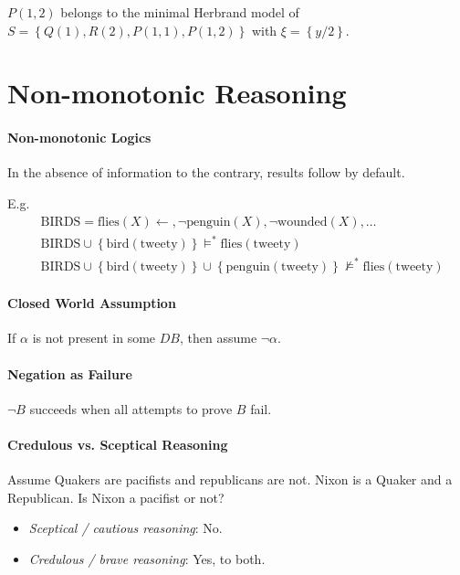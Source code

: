 \documentclass[twocolumn,english]{article}
\begin{document}
$P\left(1,2\right)$ belongs to the minimal Herbrand model of $S=\left\{ Q\left(1\right),R\left(2\right),P\left(1,1\right),P\left(1,2\right)\right\} $
with $\xi=\left\{ y/2\right\} $.

\section{Non-monotonic Reasoning}

\paragraph{Non-monotonic Logics}

In the absence of information to the contrary, results follow by default.

E.g.
\begin{align*}
 & \text{BIRDS}=\text{flies}\left(X\right)\leftarrow,\lnot\text{penguin}\left(X\right),\lnot\text{wounded}\left(X\right),\dots\\
 & \text{BIRDS}\cup\left\{ \text{bird}\left(\text{tweety}\right)\right\} \vDash^{*}\text{flies}\left(\text{tweety}\right)\\
 & \text{BIRDS}\cup\left\{ \text{bird}\left(\text{tweety}\right)\right\} \cup\left\{ \text{penguin}\left(\text{tweety}\right)\right\} \not\vDash^{*}\text{flies}\left(\text{tweety}\right)
\end{align*}

\paragraph{Closed World Assumption}

If $\alpha$ is not present in some $DB$, then assume $\lnot\alpha$.

\paragraph{Negation as Failure}

$\lnot B$ succeeds when all attempts to prove $B$ fail.

\paragraph{Credulous vs. Sceptical Reasoning}

Assume Quakers are pacifists and republicans are not. Nixon is a Quaker
and a Republican. Is Nixon a pacifist or not?
\begin{itemize}
\item \emph{Sceptical / cautious reasoning}: No.
\item \emph{Credulous / brave reasoning}: Yes, to both.
\end{itemize}
\end{document}

